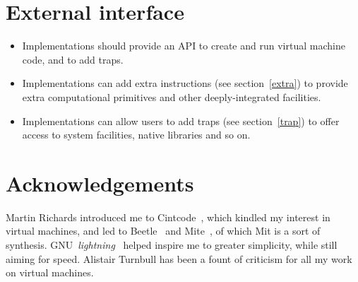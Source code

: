 \documentclass[a4paper]{article}
\begin{document}
\section{External interface}

\begin{itemize}
\item Implementations should provide an API to create and run virtual machine code, and to add traps.
\item Implementations can add extra instructions (see section~\ref{extra}) to provide extra computational primitives and other deeply-integrated facilities.
\item Implementations can allow users to add traps (see section~\ref{trap}) to offer access to system facilities, native libraries and so on.
\end{itemize}


\section*{Acknowledgements}

Martin Richards introduced me to Cintcode~\cite{cintweb}, which
kindled my interest in virtual machines, and led to
Beetle~\cite{beetledis} and Mite~\cite{mite0},
of which Mit is a sort of synthesis.
GNU~\emph{lightning}~\cite{lightning} helped inspire me to greater
simplicity, while still aiming for speed. Alistair Turnbull
has been a fount of criticism for all my work on virtual machines.



\end{document}
